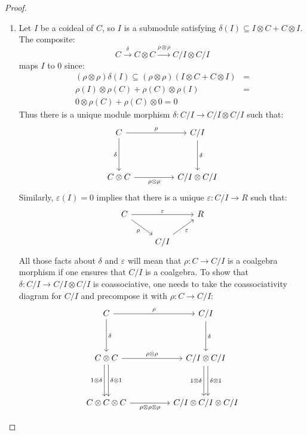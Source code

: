 \documentclass[8pt]{article}
\theoremstyle{definition}
\theoremstyle{definition}
\theoremstyle{definition}
\theoremstyle{definition}
\theoremstyle{definition}
\theoremstyle{definition}
\theoremstyle{definition}
\theoremstyle{definition}
\theoremstyle{definition}
\theoremstyle{definition}
\theoremstyle{definition}
\theoremstyle{definition}
\theoremstyle{definition}
\theoremstyle{definition}
\theoremstyle{question}
\begin{document}
\begin{proof}
  $ $

  \begin{enumerate}
    \item Let $I$ be a coideal of $C$, so $I$ is a submodule satisfying
    $\delta(I) \subseteq I \otimes C + C \otimes I$. The composite:
    \[
    C \xrightarrow{\delta} C \otimes C \xrightarrow{\rho \otimes \rho} C/I \otimes C/I
    \]
    maps $I$ to 0 since:
    \begin{align*}
    (\rho \otimes \rho)\delta(I) \subseteq (\rho \otimes \rho)(I \otimes C + C \otimes I) &=  \\
    \rho(I) \otimes \rho(C) +  \rho(C) \otimes \rho(I) &= \\ 
    0 \otimes \rho(C) +  \rho(C) \otimes 0 = 0
    \end{align*}
    Thus there is a unique module morphism $\delta : C/I \to C/I \otimes C/I$ such that:
    \[
    \begin{tikzcd}
    C \ar[rr, "\rho"] \ar[dd, "\delta"'] && C/I \ar[dd, "\delta"]\\
    \\
    C \otimes C \ar[rr, "\rho \otimes \rho"'] && C/I \otimes C/I
    \end{tikzcd}
    \]
    Similarly, $\varepsilon(I) = 0$ implies that there is a unique $\varepsilon : C/I \to R$ such that:
    \[
    \begin{tikzcd}
      C \ar[rr, "\varepsilon"] \ar[dr, "\rho"'] && R \\
      & C/I \ar[ur, "\varepsilon"']
    \end{tikzcd}
    \]
    All those facts about $\delta$ and $\varepsilon$ will mean that $\rho : C \to C/I$ is a coalgebra morphism if
    one ensures that $C/I$ is a coalgebra. To show that $\delta : C/I \to C/I \otimes C/I$ is coassociative, one needs to
    take the coassociativity diagram for $C/I$ and precompose it with $\rho : C \to C/I$:
    \[
    \begin{tikzcd}
      C \ar[rr, "\rho"] \ar[dd, "\delta"] && C/I \ar[dd, "\delta"] \\
      \\
      C \otimes C \ar[dd, shift left, "\delta \otimes 1"] \ar[dd, shift right, "1 \otimes \delta"'] \ar[rr, "\rho \otimes \rho"] && C/I \otimes C/I \ar[dd, shift left, "\delta \otimes 1"] \ar[dd, shift right, "1 \otimes \delta"'] \\
      \\
      C \otimes C \otimes C  \ar[rr, "\rho \otimes \rho \otimes \rho"'] && C/I \otimes C/I \otimes C/I

\end{tikzcd}\]
\end{enumerate}
\end{proof}
\end{document}
